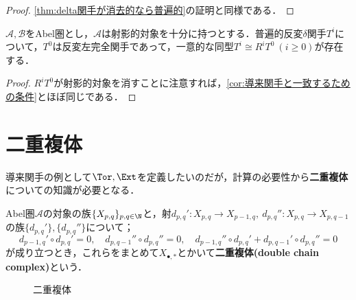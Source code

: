 \begin{proof}
	\ref{thm:delta関手が消去的なら普遍的}の証明と同様である．
\end{proof}

\begin{cor}\label{cor:反変delta関手が普遍的なら導来関手}
	$\mathscr{A},\mathscr{B}$をAbel圏とし，$\mathscr{A}$は射影的対象を十分に持つとする．普遍的反変$\delta$関手$T^i$について，$T^0$は反変左完全関手であって，一意的な同型$T^i\cong R^iT^0~(i\geq 0)$が存在する．
\end{cor}

\begin{proof}
	$R^iT^0$が射影的対象を消すことに注意すれば，\ref{cor:導来関手と一致するための条件}とほぼ同じである．
\end{proof}
\section{二重複体}
導来関手の例として$\Tor,\Ext$を定義したいのだが，計算の必要性から\textbf{二重複体}についての知識が必要となる．

\begin{defi}[二重複体]
	Abel圏$\mathscr{A}$の対象の族$\{X_{p,q}\}_{p,q\in\N}$と，射$d_{p,q}':X_{p,q}\to X_{p-1,q},~d_{p,q}'':X_{p,q}\to X_{p,q-1}$の族$\{d_{p,q}'\},\{d_{p,q}''\}$について；
	\[d_{p-1,q}'\circ d_{p,q}'=0,\quad d_{p,q-1}''\circ d_{p,q}''=0,\quad d_{p-1,q}''\circ d_{p,q}'+d_{p,q-1}'\circ d_{p,q}''=0\]
	が成り立つとき，これらをまとめて$X_{\bullet,\ast}$とかいて\textbf{二重複体(double chain complex)}という．
\end{defi}

\begin{figure}[H]
	\centering
	\caption{二重複体}\label{fig:二重複体}
\end{figure}

